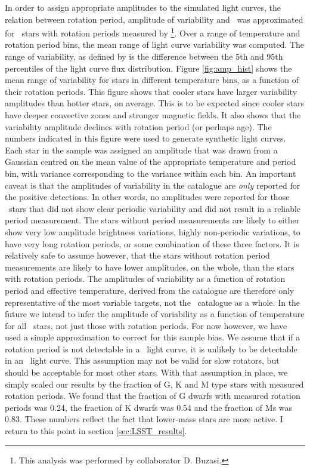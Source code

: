 In order to assign appropriate amplitudes to the simulated light curves,
the relation between rotation period, amplitude of variability
and \teff\ was approximated for \kepler\ stars with rotation periods
measured by \citet{Mcquillan2014}\footnote{This analysis was performed by
collaborator D. Buzasi.}.
Over a range of temperature and rotation period bins, the mean range of light
curve variability was computed.
The range of variability, as defined by \citet{Mcquillan2014} is the
difference between the 5th and 95th percentiles of the light curve flux
distribution.
Figure \ref{fig:amp_hist} shows the mean range of variability for stars in
different temperature bins, as a function of their rotation periods.
This figure shows that cooler stars have larger variability amplitudes than
hotter stars, on average.
This is to be expected since cooler stars have deeper convective zones and
stronger magnetic fields.
It also shows that the variability amplitude declines with rotation period
(or perhaps age).
The numbers indicated in this figure were used to generate synthetic light
curves.
Each star in the sample was assigned an amplitude that was drawn from a
Gaussian centred on the mean value of the appropriate temperature and period
bin, with variance corresponding to the variance within each bin.
An important caveat is that the amplitudes of variability in the
\citet{Mcquillan2014} catalogue are {\it only} reported for the positive
detections.
In other words, no amplitudes were reported for those \kepler\ stars that did
not show clear periodic variability and did not result in a reliable period
measurement.
The stars without period measurements are likely to either show very low
amplitude brightness variations, highly non-periodic variations, to have very
long rotation periods, or some combination of these three factors.
It is relatively safe to assume however, that the stars without rotation
period measurements are likely to have lower amplitudes, on the whole, than
the stars with rotation periods.
The amplitudes of variability as a function of rotation period and effective
temperature, derived from the \citet{Mcquillan2014} catalogue are therefore
only representative of the most variable targets, not the \kepler\ catalogue
as a whole.
In the future we intend to infer the amplitude of variability as a function of
temperature for all \kepler\ stars, not just those with rotation periods.
For now however, we have used a simple approximation to correct for this
sample bias.
We assume that if a rotation period is not detectable in a \kepler\ light
curve, it is unlikely to be detectable in an \LSST\ light curve.
This assumption may not be valid for slow rotators, but should be acceptable
for most other stars.
With that assumption in place, we simply scaled our results by the fraction of
G, K and M type stars with measured rotation periods.
We found that the fraction of G dwarfs with measured rotation periods was
0.24, the fraction of K dwarfs was 0.54 and the fraction of Ms was 0.83.
These numbers reflect the fact that lower-mass stars are more active.
I return to this point in section \textsection\ref{sec:LSST_results}.

